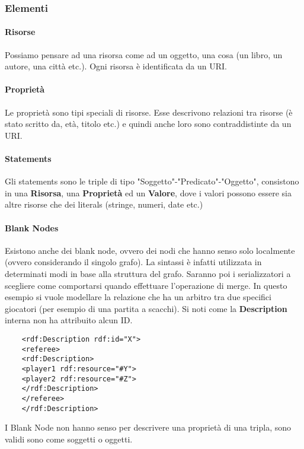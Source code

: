 \subsubsection{Elementi}
\paragraph{Risorse}
Possiamo pensare ad una risorsa come ad un oggetto, una cosa (un libro, un autore, una città etc.). Ogni risorsa è identificata da un URI.
\paragraph{Proprietà}
Le proprietà sono tipi speciali di risorse. Esse descrivono relazioni tra risorse (è stato scritto da, età, titolo etc.) e quindi anche loro sono contraddistinte da un URI.
\paragraph{Statements}
Gli statements sono le triple di tipo "Soggetto"-"Predicato"-"Oggetto", consistono in una \textbf{Risorsa}, una \textbf{Proprietà} ed un \textbf{Valore}, dove i valori possono essere sia altre risorse che dei literals (stringe, numeri, date etc.)
\paragraph{Blank Nodes}
Esistono anche dei blank node, ovvero dei nodi che hanno senso solo localmente (ovvero considerando il singolo grafo). La sintassi è infatti utilizzata in determinati modi in base alla struttura del grafo. Saranno poi i serializzatori a scegliere come comportarsi quando effettuare l'operazione di merge. In questo esempio si vuole modellare la relazione che ha un arbitro tra due specifici giocatori (per esempio di una partita a scacchi). Si noti come la \textbf{Description} interna non ha attribuito alcun ID.
\begin{verbatim}
	<rdf:Description rdf:id="X">
	<referee>
	<rdf:Description>
	<player1 rdf:resource="#Y">
	<player2 rdf:resource="#Z">
	</rdf:Description>
	</referee>
	</rdf:Description>
\end{verbatim}
I Blank Node non hanno senso per descrivere una proprietà di una tripla, sono validi sono come soggetti o oggetti.

